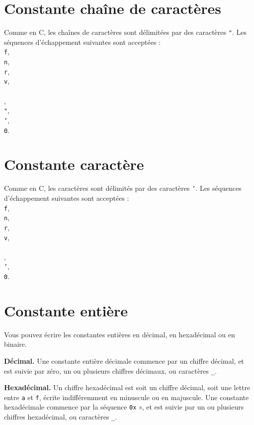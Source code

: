 \section{Constante chaîne de caractères}

Comme en C, les chaînes de caractères sont délimitées par des caractères \texttt{"}. Les séquences d’échappement suivantes sont acceptées : \texttt{\\f}, \texttt{\\n}, \texttt{\\r}, \texttt{\\v}, \texttt{\\\\}, \texttt{\\"}, \texttt{\\'}, \texttt{\\0}.

\section{Constante caractère}

Comme en C, les caractères sont délimités par des caractères \texttt{'}.  Les séquences d’échappement suivantes sont acceptées : \texttt{\\f}, \texttt{\\n}, \texttt{\\r}, \texttt{\\v}, \texttt{\\\\}, \texttt{\\'}, \texttt{\\0}.

\section{Constante entière}

Vous pouvez écrire les constantes entières en décimal, en hexadécimal ou en binaire. 

\textbf{Décimal.} Une constante entière décimale commence par un chiffre décimal, et est suivie par zéro, un ou plusieurs chiffres décimaux, ou caractères \texttt{\_}.

\textbf{Hexadécimal.} Un chiffre hexadécimal est soit un chiffre décimal, soit une lettre entre \texttt{a} et \texttt{f}, écrite indifféremment en minuscule ou en majuscule. Une constante hexadécimale commence par la séquence \texttt{0x} », et est suivie par un ou plusieurs chiffres hexadécimal, ou caractères \texttt{\_}.

